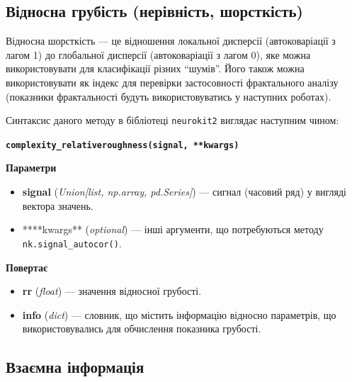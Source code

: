 \documentclass[
  letterpaper,
]{report}
\providecommand{\tightlist}{%
  \setlength{\itemsep}{0pt}\setlength{\parskip}{0pt}}\usepackage{longtable,booktabs,array}
\begin{document}
\hypertarget{ux432ux456ux434ux43dux43eux441ux43dux430-ux433ux440ux443ux431ux456ux441ux442ux44c-ux43dux435ux440ux456ux432ux43dux456ux441ux442ux44c-ux448ux43eux440ux441ux442ux43aux456ux441ux442ux44c}{%
\subsection{Відносна грубість (нерівність,
шорсткість)}\label{ux432ux456ux434ux43dux43eux441ux43dux430-ux433ux440ux443ux431ux456ux441ux442ux44c-ux43dux435ux440ux456ux432ux43dux456ux441ux442ux44c-ux448ux43eux440ux441ux442ux43aux456ux441ux442ux44c}}

Відносна шорсткість --- це відношення локальної дисперсії
(автоковаріації з лагом 1) до глобальної дисперсії (автоковаріації з
лагом 0), яке можна використовувати для класифікації різних ``шумів''.
Його також можна використовувати як індекс для перевірки застосовності
фрактального аналізу (показники фрактальності будуть використовуватись у
наступних роботах).

Синтаксис даного методу в бібліотеці \texttt{neurokit2} виглядає
наступним чином:

\textbf{\texttt{complexity\_relativeroughness(signal,\ **kwargs)}}

\textbf{Параметри}

\begin{itemize}
\tightlist
\item
  \textbf{signal} (\emph{Union{[}list, np.array, pd.Series{]}}) ---
  сигнал (часовий ряд) у вигляді вектора значень.
\item
  ****kwargs** (\emph{optional}) --- інші аргументи, що потребуються
  методу \texttt{nk.signal\_autocor()}.
\end{itemize}

\textbf{Повертає}

\begin{itemize}
\tightlist
\item
  \textbf{rr} (\emph{float}) --- значення відносної грубості.
\item
  \textbf{info} (\emph{dict}) --- словник, що містить інформацію
  відносно параметрів, що використовувались для обчислення показника
  грубості.
\end{itemize}

\hypertarget{ux432ux437ux430ux454ux43cux43dux430-ux456ux43dux444ux43eux440ux43cux430ux446ux456ux44f}{%
\subsection{Взаємна
інформація}\label{ux432ux437ux430ux454ux43cux43dux430-ux456ux43dux444ux43eux440ux43cux430ux446ux456ux44f}}
\end{document}
